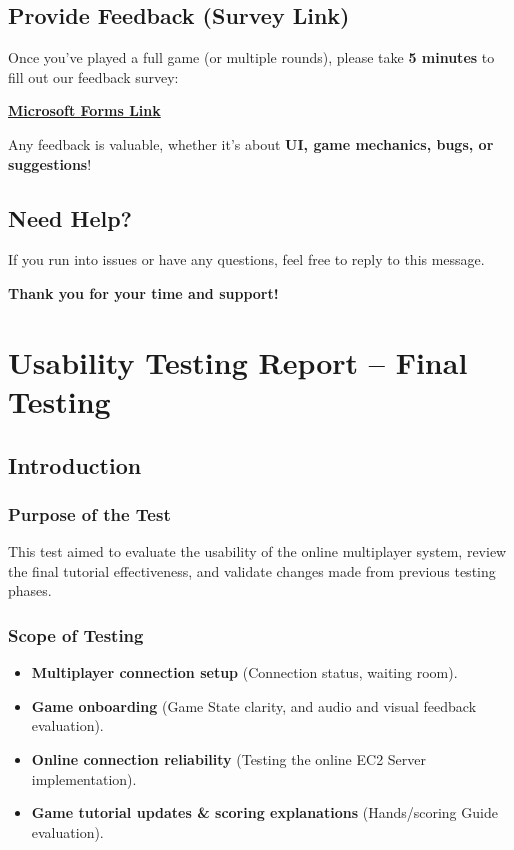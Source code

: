 \documentclass{article}
\begin{document}
\subsection{Provide Feedback (Survey Link)}

Once you’ve played a full game (or multiple rounds), please take \textbf{5 minutes} to fill out our feedback survey:

\href{https://forms.office.com/r/gp8yrLXu9v}{\textbf{Microsoft Forms Link}}

Any feedback is valuable, whether it's about \textbf{UI, game mechanics, bugs, or suggestions}!

\subsection{Need Help?}
If you run into issues or have any questions, feel free to reply to this message.

\bigskip

\begin{center}
\textbf{Thank you for your time and support!}
\end{center}


\section{Usability Testing Report – Final Testing}

\subsection{Introduction}

\subsubsection{Purpose of the Test}
This test aimed to evaluate the usability of the online multiplayer system, review the final tutorial effectiveness, and validate changes made from previous testing phases.

\subsubsection{Scope of Testing}
\begin{itemize}
    \item \textbf{Multiplayer connection setup} (Connection status, waiting room).
    \item \textbf{Game onboarding} (Game State clarity, and audio and visual feedback evaluation).
    \item \textbf{Online connection reliability} (Testing the online EC2 Server implementation).
    \item \textbf{Game tutorial updates \& scoring explanations} (Hands/scoring Guide evaluation).
\end{itemize}
\end{document}
